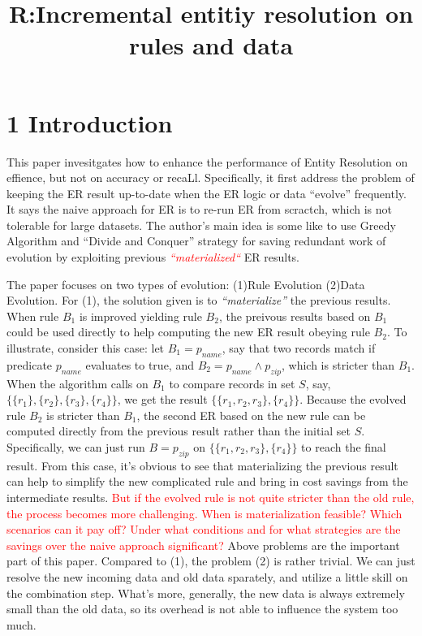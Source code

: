 \documentclass[12pt,a4paper]{report}
\title{R:Incremental entitiy resolution on rules and data}
\begin{document}
\maketitle

\section*{1 Introduction}
This paper invesitgates how to enhance the performance of Entity Resolution on effience, but not on accuracy or recaLl. Specifically, it first address the problem of keeping the ER result up-to-date when the ER logic or data ``evolve'' frequently. It says the naive approach for ER is to re-run ER from scractch, which is not tolerable for large datasets. The author's main idea is some like to use Greedy Algorithm and ``Divide and Conquer'' strategy for saving redundant work of evolution by exploiting previous \textcolor{red}{\emph{``materialized``}} ER results.

The paper focuses on two types of evolution: (1)Rule Evolution (2)Data Evolution. For (1), the solution given is to \emph{``materialize''} the previous results. When rule $B_{1}$ is improved yielding rule $B_{2}$, the preivous results based on $B_{1}$ could be used directly to help computing the new ER result obeying rule $B_{2}$. To illustrate, consider this case: let $B_{1}=p_{name}$, say that two records match if predicate $p_{name}$ evaluates to true, and $B_{2}=p_{name}\wedge p_{zip}$, which is stricter than $B_{1}$. When the algorithm calls on $B_{1}$ to compare records in set $S$, say, $\{\{r_{1}\}, \{r_{2}\}, \{r_{3}\}, \{r_{4}\}\}$, we get the result $\{\{r_{1},r_{2},r_{3}\}, \{r_{4}\}\}$. Because the evolved rule $B_{2}$ is stricter than ${B_{1}}$, the second ER based on the new rule can be computed directly from the previous result rather than the initial set $S$. Specifically, we can just run $B=p_{zip}$ on $\{\{r_{1},r_{2},r_{3}\}, \{r_{4}\}\}$ to reach the final result. From this case, it's obvious to see that materializing the previous result can help to simplify the new complicated rule and bring in cost savings from the intermediate results. \textcolor{red}{But if the evolved rule is not quite stricter than the old rule, the process becomes more challenging. When is materialization feasible? Which scenarios can it pay off? Under what conditions and for what strategies are the savings over the naive approach significant?} Above problems are the important part of this paper. Compared to (1), the problem (2) is rather trivial. We can just resolve the new incoming data and old data sparately, and utilize a little skill on the combination step. What's more, generally, the new data is always extremely small than the old data, so its overhead is not able to influence the system too much.
\end{document}
